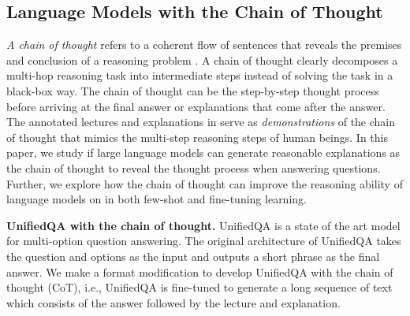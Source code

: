\subsection{Language Models with the Chain of Thought}
\textit{A chain of thought} refers to a coherent flow of sentences that reveals the premises and conclusion of a reasoning problem \cite{wei2022chain}. A chain of thought clearly decomposes a multi-hop reasoning task into intermediate steps instead of solving the task in a black-box way. The chain of thought can be the step-by-step thought process \cite{wei2022chain} before arriving at the final answer or explanations \cite{narang2020wt5} that come after the answer. The annotated lectures and explanations in \name{} serve as \emph{demonstrations} of the chain of thought that mimics the multi-step reasoning steps of human beings. In this paper, we study if large language models can generate reasonable explanations as the chain of thought to reveal the thought process when answering \name{} questions. Further, we explore how the chain of thought can improve the reasoning ability of language models on \name{} in both few-shot and fine-tuning learning.


\textbf{UnifiedQA with the chain of thought.} UnifiedQA \cite{khashabi2020unifiedqa} is a state of the art model for multi-option question answering. The original architecture of UnifiedQA takes the question and options as the input and outputs a short phrase as the final answer. We make a format modification to develop UnifiedQA with the chain of thought (CoT), i.e., UnifiedQA is fine-tuned to generate a long sequence of text which consists of the answer followed by the lecture and explanation.
 
